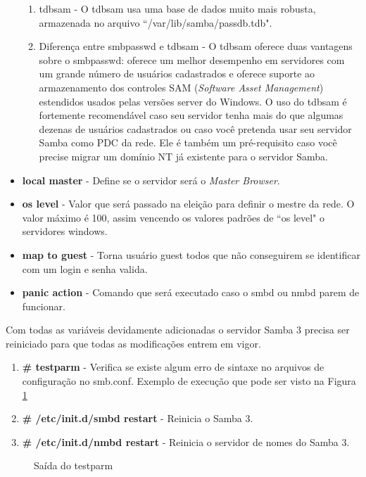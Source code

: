 \begin{itemize}
\begin{enumerate}
			\item{tdbsam} - O tdbsam usa uma base de dados muito mais robusta, armazenada no arquivo ``/var/lib/samba/passdb.tdb".\cite{BACKEND}
			\item{Diferença entre smbpasswd e tdbsam} - O tdbsam oferece duas vantagens sobre o smbpasswd: oferece um melhor desempenho em servidores com um grande número de usuários cadastrados e oferece suporte ao armazenamento dos controles SAM (\textit{Software Asset Management}) estendidos usados pelas versões server do Windows. O uso do tdbsam é fortemente recomendável caso seu servidor tenha mais do que algumas dezenas de usuários cadastrados ou caso você pretenda usar seu servidor Samba como PDC da rede. Ele é também um pré-requisito caso você precise migrar um domínio NT já existente para o servidor Samba. \cite{BACKEND}
		\end{enumerate}
	\item \textbf{local master} - Define se o servidor será o \textit{Master Browser}.
	\item \textbf{os level} - Valor que será passado na eleição para definir o mestre da rede. O valor máximo é 100, assim vencendo os valores padrões de ``os level" o servidores windows.
	\item \textbf{map to guest} - Torna usuário guest todos que não conseguirem se identificar com um login e senha valida.
	\item \textbf{panic action} - Comando que será executado caso o smbd ou nmbd parem de funcionar.
\end{itemize}

Com todas as variáveis devidamente adicionadas o servidor Samba 3 precisa ser reiniciado para que todas as modificações entrem em vigor.

\begin{enumerate}
	\item \textbf{\# testparm} - Verifica se existe algum erro de sintaxe no arquivos de configuração no smb.conf. Exemplo de execução que pode ser visto na Figura \ref{testparm}
	\item \textbf{\# /etc/init.d/smbd restart} - Reinicia o Samba 3.
	\item \textbf{\# /etc/init.d/nmbd restart} - Reinicia o servidor de nomes do Samba 3.
\end{enumerate}

\begin{figure}[ht]
   	\centering
   	\caption{Saída do testparm}
    \label{testparm}
\end{figure}

